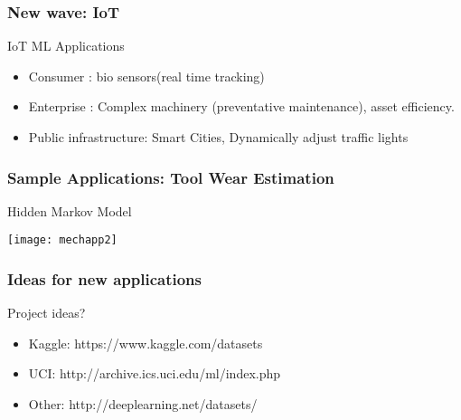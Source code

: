 \begin{frame}[fragile]\frametitle{New wave: IoT}
IoT ML Applications
\begin{itemize}
\item  Consumer : bio sensors(real time tracking)
\item  Enterprise : Complex machinery (preventative maintenance), asset efficiency.
\item Public infrastructure: Smart Cities, Dynamically adjust traffic lights
\end{itemize}
\end{frame}
\begin{frame}[fragile]\frametitle{Sample Applications: Tool Wear Estimation}
 Hidden Markov Model
\begin{center}
\texttt{[image: mechapp2]}
\end{center}
\end{frame}





\begin{frame}[fragile]\frametitle{Ideas for new applications}
Project ideas?
\begin{itemize}
\item Kaggle: https://www.kaggle.com/datasets
\item UCI: http://archive.ics.uci.edu/ml/index.php
\item  Other: http://deeplearning.net/datasets/
\end{itemize}
\end{frame}






